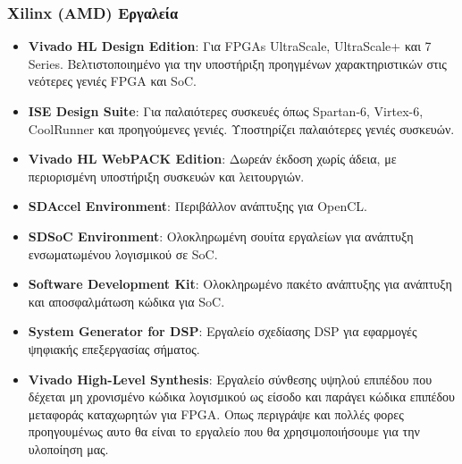 \subsubsection{Xilinx (AMD) Εργαλεία}
\begin{itemize}
  \item \textbf{Vivado HL Design Edition}: Για FPGAs UltraScale, UltraScale+ και 7 Series. Βελτιστοποιημένο για την υποστήριξη προηγμένων χαρακτηριστικών στις νεότερες γενιές FPGA και SoC.
  
  \item \textbf{ISE Design Suite}: Για παλαιότερες συσκευές όπως Spartan-6, Virtex-6, CoolRunner και προηγούμενες γενιές. Υποστηρίζει παλαιότερες γενιές συσκευών.
  
  \item \textbf{Vivado HL WebPACK Edition}: Δωρεάν έκδοση χωρίς άδεια, με περιορισμένη υποστήριξη συσκευών και λειτουργιών.
  
  \item \textbf{SDAccel Environment}: Περιβάλλον ανάπτυξης για OpenCL.
  
  \item \textbf{SDSoC Environment}: Ολοκληρωμένη σουίτα εργαλείων για ανάπτυξη ενσωματωμένου λογισμικού σε SoC.
  
  \item \textbf{Software Development Kit}: Ολοκληρωμένο πακέτο ανάπτυξης για ανάπτυξη και αποσφαλμάτωση κώδικα για SoC.
  
  \item \textbf{System Generator for DSP}: Εργαλείο σχεδίασης DSP για εφαρμογές ψηφιακής επεξεργασίας σήματος.
  
  \item \textbf{Vivado High-Level Synthesis}: Εργαλείο σύνθεσης υψηλού επιπέδου που δέχεται μη χρονισμένο κώδικα λογισμικού ως είσοδο και παράγει κώδικα επιπέδου μεταφοράς καταχωρητών για FPGA.
  Οπως περιγράψε και πολλές φορες προηγουμένως αυτο θα είναι το εργαλείο που θα χρησιμοποιήσουμε για την υλοποίηση μας.
\end{itemize}

